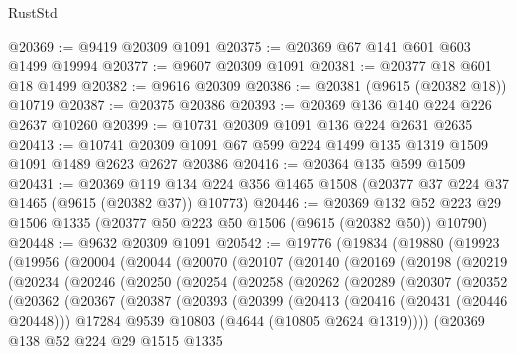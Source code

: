 \begin{lexlean}{RustStd}
\begin{coremodule}
@20369 := @9419 @20309 @1091
@20375 := @20369 @67 @141 @601 @603 @1499 @19994
@20377 := @9607 @20309 @1091
@20381 := @20377 @18 @601 @18 @1499
@20382 := @9616 @20309
@20386 := @20381 (@9615 (@20382 @18)) @10719
@20387 := @20375 @20386
@20393 := @20369 @136 @140 @224 @226 @2637 @10260
@20399 := @10731 @20309 @1091 @136 @224 @2631 @2635
@20413 := @10741 @20309 @1091 @67 @599 @224 @1499 @135 @1319 @1509 @1091 @1489 @2623 @2627 @20386
@20416 := @20364 @135 @599 @1509
@20431 := @20369
    @119
    @134
    @224
    @356
    @1465
    @1508
    (@20377 @37 @224 @37 @1465 (@9615 (@20382 @37)) @10773)
@20446 := @20369
    @132
    @52
    @223
    @29
    @1506
    @1335
    (@20377 @50 @223 @50 @1506 (@9615 (@20382 @50)) @10790)
@20448 := @9632 @20309 @1091
@20542 := @19776
    (@19834
      (@19880
        (@19923
          (@19956
            (@20004
              (@20044
                (@20070
                  (@20107
                    (@20140
                      (@20169
                        (@20198
                          (@20219
                            (@20234
                              (@20246
                                (@20250
                                  (@20254
                                    (@20258
                                      (@20262
                                        (@20289
                                          (@20307
                                            (@20352
                                              (@20362
                                                (@20367
                                                  (@20387
                                                    (@20393
                                                      (@20399
                                                        (@20413
                                                          (@20416 (@20431 (@20446 @20448)))
                                                          @17284
                                                          @9539
                                                          @10803
                                                          (@4644 (@10805 @2624 @1319))))
                                                      (@20369
                                                        @138
                                                        @52
                                                        @224
                                                        @29
                                                        @1515
                                                        @1335

\end{coremodule}
\end{lexlean}
